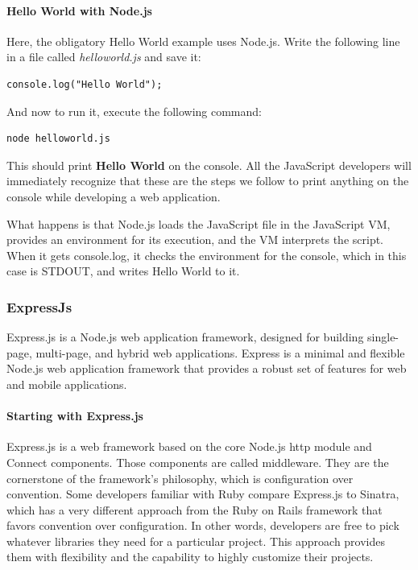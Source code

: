 \paragraph*{Hello World with Node.js}
\hfill \break
Here, the obligatory Hello World example uses Node.js. Write the following line in a
file called \textit{helloworld.js} and save it:
\begin{lstlisting}
console.log("Hello World");
\end{lstlisting}
And now to run it, execute the following command:
\begin{lstlisting}
node helloworld.js
\end{lstlisting}
This should print \textbf{Hello World} on the console. All the JavaScript developers will
immediately recognize that these are the steps we follow to print anything on the
console while developing a web application.

What happens is that Node.js loads the JavaScript file in the JavaScript VM, provides
an environment for its execution, and the VM interprets the script. When it gets
console.log, it checks the environment for the console, which in this case is STDOUT,
and writes Hello World to it.\cite{21}


\subsubsection{ExpressJs}
Express.js is a Node.js web application framework, designed for building single-page, multi-page, and hybrid web applications.
Express is a minimal and flexible Node.js web application framework that provides a robust set of features for web and mobile applications.\cite{16}
\paragraph*{Starting with Express.js}
\hfill \break
Express.js is a web framework based on the core Node.js http module and Connect components. Those components are called middleware. They are the cornerstone of the framework’s philosophy, which is configuration over convention. Some developers familiar with Ruby compare Express.js to Sinatra, which has a very different approach from the Ruby on Rails framework that favors convention over configuration. In other words, developers are free to pick whatever libraries they need for a particular project. This approach provides them with flexibility and the
capability to highly customize their projects.\cite{15}

